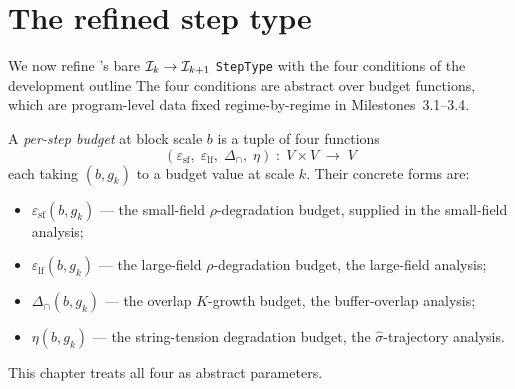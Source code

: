 \begin{mainfigure}
\centering

\caption{The block-spin step $\Ical_k \to \Ical_{k+1}$
diagrammatically.  The morphism $\Tb$ carries the
inductive state from scale $k$ to scale $k+1$; the orange 2-cell
$\Theta_k$ records the per-step $\sigh$ degradation
$\sighk \Rightarrow \sighk - \etak$ as a typed object separate
from the step itself.  The four budget functions
$\varepsilon_{\mathrm{sf}}, \varepsilon_{\mathrm{lf}}, \Delta_\cap,
\eta$ are abstract parameters on the step type.}
\label{fig:block-spin-2cell}
\end{mainfigure}

\section{The refined step type}
\label{sec:refined-type}

We now refine 's bare $\Ical_k \to \Ical_{k+1}$ \texttt{StepType} with the four conditions of the development outline  The four conditions are abstract over budget functions, which are program-level data fixed regime-by-regime in Milestones~3.1--3.4.

\begin{definition}
\label{def:budget-functions}
A \emph{per-step budget} at block scale $b$ is a tuple of four functions
\begin{equation*}
  (\varepsilon_{\mathrm{sf}}, \;\varepsilon_{\mathrm{lf}}, \;\Delta_{\cap}, \;\eta) \;\colon\; V \times V \;\longrightarrow\; V
\end{equation*}
each taking $(b, g_k)$ to a budget value at scale $k$.  Their concrete forms are:
\begin{itemize}
  \item $\varepsilon_{\mathrm{sf}}(b, g_k)$ --- the small-field $\rho$-degradation budget, supplied in the small-field analysis;
  \item $\varepsilon_{\mathrm{lf}}(b, g_k)$ --- the large-field $\rho$-degradation budget, the large-field analysis;
  \item $\Delta_{\cap}(b, g_k)$ --- the overlap $K$-growth budget, the buffer-overlap analysis;
  \item $\eta(b, g_k)$ --- the string-tension degradation budget, the $\widehat\sigma$-trajectory analysis.
\end{itemize}
This chapter treats all four as abstract parameters.
\end{definition}

